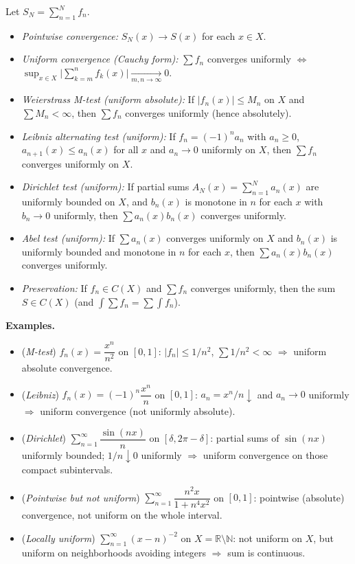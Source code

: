 \documentclass[12pt,a4paper]{article}
\theoremstyle{plain}
\theoremstyle{definition}
\theoremstyle{remark}
\theoremstyle{remark}
\begin{document}
	Let $S_N=\sum_{n=1}^N f_n$.
	\begin{itemize}
		\item \emph{Pointwise convergence:} $S_N(x)\to S(x)$ for each $x\in X$.
		\item \emph{Uniform convergence (Cauchy form):} $\sum f_n$ converges uniformly $\iff$
		$\sup_{x\in X}\big|\sum_{k=m}^{n} f_k(x)\big|\xrightarrow[m,n\to\infty]{}0$.
		\item \emph{Weierstrass M-test (uniform absolute):} If $|f_n(x)|\le M_n$ on $X$ and
		$\sum M_n<\infty$, then $\sum f_n$ converges uniformly (hence absolutely).
		\item \emph{Leibniz alternating test (uniform):} If $f_n=(-1)^n a_n$ with $a_n\ge0$,
		$a_{n+1}(x)\le a_n(x)$ for all $x$ and $a_n\to0$ uniformly on $X$,
		then $\sum f_n$ converges uniformly on $X$.
		\item \emph{Dirichlet test (uniform):} If partial sums $A_N(x)=\sum_{n=1}^N a_n(x)$ are
		uniformly bounded on $X$, and $b_n(x)$ is monotone in $n$ for each $x$ with
		$b_n\to0$ uniformly, then $\sum a_n(x)b_n(x)$ converges uniformly.
		\item \emph{Abel test (uniform):} If $\sum a_n(x)$ converges uniformly on $X$ and
		$b_n(x)$ is uniformly bounded and monotone in $n$ for each $x$, then
		$\sum a_n(x)b_n(x)$ converges uniformly.
		\item \emph{Preservation:} If $f_n\in C(X)$ and $\sum f_n$ converges uniformly, then
		the sum $S\in C(X)$ (and $\int \sum f_n=\sum \int f_n$).
	\end{itemize}
	
	\textbf{Examples.}
	\begin{itemize}
		\item (\emph{M-test}) $f_n(x)=\dfrac{x^n}{n^2}$ on $[0,1]$:
		$|f_n|\le 1/n^2$, $\sum 1/n^2<\infty$ $\Rightarrow$ uniform absolute convergence.
		\item (\emph{Leibniz}) $f_n(x)=(-1)^n\dfrac{x^n}{n}$ on $[0,1]$:
		$a_n=x^n/n\downarrow$ and $a_n\to0$ uniformly $\Rightarrow$ uniform convergence (not uniformly absolute).
		\item (\emph{Dirichlet}) $\sum_{n=1}^\infty \dfrac{\sin(nx)}{n}$ on $[\delta,2\pi-\delta]$:
		partial sums of $\sin(nx)$ uniformly bounded; $1/n\downarrow 0$ uniformly
		$\Rightarrow$ uniform convergence on those compact subintervals.
		\item (\emph{Pointwise but not uniform}) $\sum_{n=1}^\infty \dfrac{n^2x}{1+n^4x^2}$ on $[0,1]$:
		pointwise (absolute) convergence, not uniform on the whole interval.
		\item (\emph{Locally uniform}) $\sum_{n=1}^\infty (x-n)^{-2}$ on $X=\mathbb{R}\setminus\mathbb{N}$:
		not uniform on $X$, but uniform on neighborhoods avoiding integers $\Rightarrow$ sum is continuous.
	\end{itemize}
	
\end{document}
